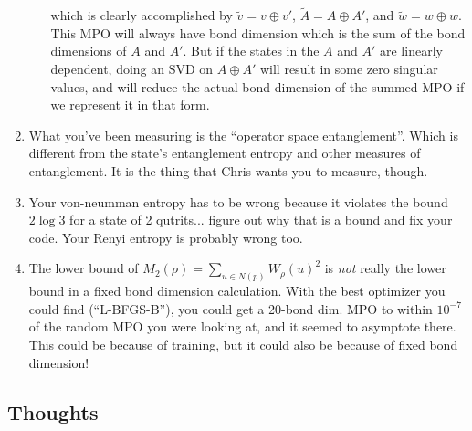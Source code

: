 \documentclass{report}
\begin{document}
\begin{enumerate}
\begin{itemize}
	which is clearly accomplished by $\tilde v=v\oplus v'$, $\tilde A=A\oplus A'$, and $\tilde w=w\oplus w$. This MPO will always have bond dimension which is the sum of the bond dimensions of $A$ and $A'$. But if the states in the $A$ and $A'$ are linearly dependent, doing an SVD on $A\oplus A'$ will result in some zero singular values, and will reduce the actual bond dimension of the summed MPO if we represent it in that form.
	\end{itemize}
\item What you've been measuring is the ``operator space entanglement''. Which is different from the state's entanglement entropy and other measures of entanglement. It is the thing that Chris wants you to measure, though.
\item Your von-neumman entropy has to be wrong because it violates the bound $2\log 3$ for a state of 2 qutrits... figure out why that is a bound and fix your code. Your Renyi entropy is probably wrong too.
\item The lower bound of $M_2(\rho)=\sum_{u\in N(p)}W_\rho(u)^2$ is \textit{not} really the lower bound in a fixed bond dimension calculation. With the best optimizer you could find (``L-BFGS-B''), you could get a 20-bond dim. MPO to within $10^{-7}$ of the random MPO you were looking at, and it seemed to asymptote there. This could be because of training, but it could also be because of fixed bond dimension! 
\end{enumerate}

\subsection{Thoughts}
\end{document}
